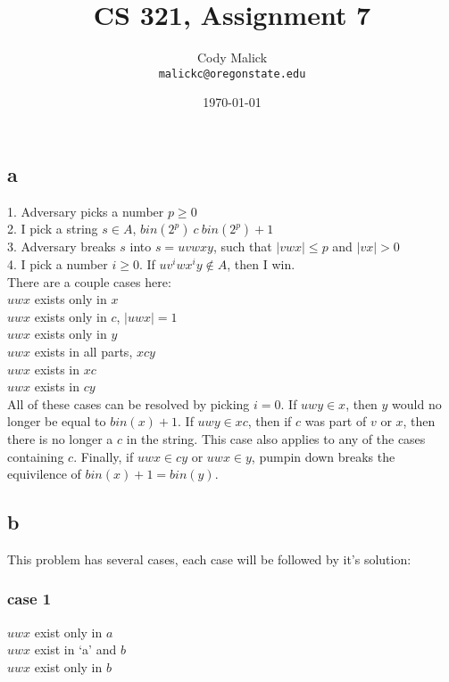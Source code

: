 \documentclass[10pt,letterpaper]{article}
\begin{document}
  \title{CS 321, Assignment 7}
  \author{Cody Malick\\
  \texttt{malickc@oregonstate.edu}}
  \date{\today}
  \maketitle

\section{}
\subsection*{a}
1. Adversary picks a number $p \geq 0$\\
2. I pick a string $s \in A$, $bin(2^p)\ c\ bin(2^p)+1$ \\
3. Adversary breaks $s$ into $s = uvwxy$, such that $|vwx| \leq p$ and $|vx| > 0$\\
4. I pick a number $i \geq 0$. If $uv^iwx^iy \notin A$, then I win.\\

There are a couple cases here:\\
$uwx$ exists only in $x$\\
$uwx$ exists only in $c$, $|uwx| = 1$\\
$uwx$ exists only in $y$\\
$uwx$ exists in all parts, $xcy$\\
$uwx$ exists in $xc$\\
$uwx$ exists in $cy$\\

All of these cases can be resolved by picking $i = 0$. If $uwy \in x$, then $y$
would no longer be equal to $bin(x)+1$. If $uwy \in xc$, then if $c$ was part
of $v$ or $x$, then there is no longer a $c$ in the string. This case also
applies to any of the cases containing $c$. Finally, if $uwx \in cy$ or $uwx \in
y$, pumpin down breaks the equivilence of $bin(x)+1 = bin(y)$.

\subsection*{b}
This problem has several cases, each case will be followed by it's solution:
\subsubsection*{case 1}
$uwx$ exist only in $a$\\
$uwx$ exist in `a' and $b$\\
$uwx$ exist only in $b$\\
\end{document}
